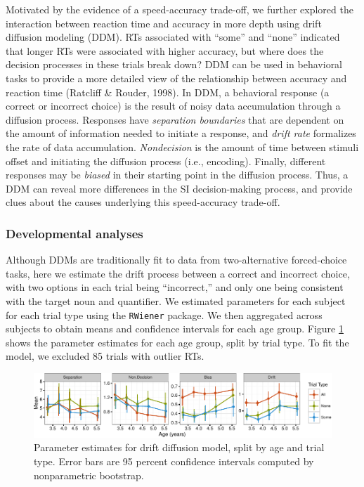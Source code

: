 \documentclass[10pt, letterpaper]{article}
\newenvironment{CodeChunk}{}{}
\begin{document}
Motivated by the evidence of a speed-accuracy trade-off, we further
explored the interaction between reaction time and accuracy in more
depth using drift diffusion modeling (DDM). RTs associated with ``some''
and ``none'' indicated that longer RTs were associated with higher
accuracy, but where does the decision processes in these trials break
down? DDM can be used in behavioral tasks to provide a more detailed
view of the relationship between accuracy and reaction time (Ratcliff \&
Rouder, 1998). In DDM, a behavioral response (a correct or incorrect
choice) is the result of noisy data accumulation through a diffusion
process. Responses have \emph{separation boundaries} that are dependent
on the amount of information needed to initiate a response, and
\emph{drift rate} formalizes the rate of data accumulation.
\emph{Nondecision} is the amount of time between stimuli offset and
initiating the diffusion process (i.e., encoding). Finally, different
responses may be \emph{biased} in their starting point in the diffusion
process. Thus, a DDM can reveal more differences in the SI
decision-making process, and provide clues about the causes underlying
this speed-accuracy trade-off.

\subsubsection{Developmental analyses}\label{developmental-analyses}

Although DDMs are traditionally fit to data from two-alternative
forced-choice tasks, here we estimate the drift process between a
correct and incorrect choice, with two options in each trial being
``incorrect,'' and only one being consistent with the target noun and
quantifier. We estimated parameters for each subject for each trial type
using the \texttt{RWiener} package. We then aggregated across subjects
to obtain means and confidence intervals for each age group. Figure
\ref{fig:devo_param_plot} shows the parameter estimates for each age
group, split by trial type. To fit the model, we excluded 85 trials with
outlier RTs.

\begin{CodeChunk}
\begin{figure}[t]

{\centering \includegraphics{figs/devo_param_plot-1} 

}

\caption[Parameter estimates for drift diffusion model, split by age and trial type]{Parameter estimates for drift diffusion model, split by age and trial type. Error bars are 95 percent confidence intervals computed by nonparametric bootstrap.}\label{fig:devo_param_plot}
\end{figure}
\end{CodeChunk}
\end{document}
